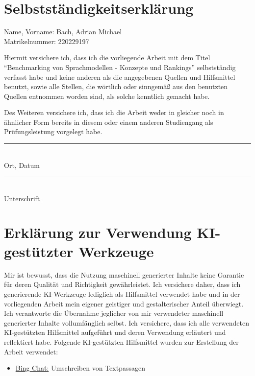 \section*{Selbstständigkeitserklärung}

Name, Vorname: Bach, Adrian Michael\\
Matrikelnummer: 220229197

\medskip
\noindent Hiermit versichere ich, dass ich die vorliegende Arbeit mit dem Titel \enquote{Benchmarking von Sprachmodellen - Konzepte und Rankings} selbstständig verfasst habe und keine anderen als die angegebenen Quellen und Hilfsmittel benutzt, sowie alle Stellen, die wörtlich oder sinngemäß aus den benutzten Quellen entnommen worden sind, als solche kenntlich gemacht habe.

\medskip
\noindent
Des Weiteren versichere ich, dass ich die Arbeit weder in gleicher noch in ähnlicher Form bereits in diesem oder einem anderen Studiengang als Prüfungsleistung vorgelegt habe.

\vspace{3cm}
\parbox{4.5cm}{
    \rule{3.5cm}{1pt}\\
    \centering Ort, Datum
}\hfill
\parbox{4.5cm}{
    \rule{3.5cm}{1pt}\\
    \centering Unterschrift
}

\newpage
\section*{Erklärung zur Verwendung KI-gestützter Werkzeuge}
Mir ist bewusst, dass die Nutzung maschinell generierter Inhalte keine Garantie für deren Qualität und Richtigkeit gewährleistet.
Ich versichere daher, dass ich generierende KI-Werkzeuge lediglich als Hilfsmittel verwendet habe und in der vorliegenden Arbeit mein eigener geistiger und gestalterischer Anteil überwiegt.
Ich verantworte die Übernahme jeglicher von mir verwendeter maschinell generierter Inhalte vollumfänglich selbst.
Ich versichere, dass ich alle verwendeten KI-gestützten Hilfsmittel
aufgeführt und deren Verwendung erläutert und reflektiert habe.
Folgende KI-gestützten Hilfsmittel wurden zur Erstellung der Arbeit verwendet:
\begin{itemize}
    \item \href{http://www.bing.com/chat}{Bing Chat:} Umschreiben von Textpassagen
\end{itemize}
